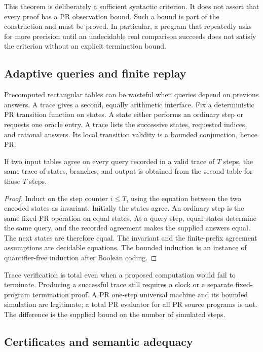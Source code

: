 This theorem is deliberately a sufficient syntactic criterion.  It does
not assert that every proof has a PR observation bound.  Such a bound is
part of the construction and must be proved.  In particular, a program
that repeatedly asks for more precision until an undecidable real
comparison succeeds does not satisfy the criterion without an explicit
termination bound.

\subsection{Adaptive queries and finite replay}

Precomputed rectangular tables can be wasteful when queries depend on
previous answers.  A trace gives a second, equally arithmetic interface.
Fix a deterministic PR transition function on states.  A state either
performs an ordinary step or requests one oracle entry.  A trace lists
the successive states, requested indices, and rational answers.  Its
local transition validity is a bounded conjunction, hence PR.

\begin{lemma}\label{lem:replay}
If two input tables agree on every query recorded in a valid trace of
\(T\) steps, the same trace of states, branches, and output is obtained
from the second table for those \(T\) steps.
\end{lemma}

\begin{proof}
Induct on the step counter \(i\le T\), using the equation between the
two encoded states as invariant.  Initially the states agree.  An ordinary
step is the same fixed PR operation on equal states.  At a query step,
equal states determine the same query, and the recorded agreement makes
the supplied answers equal.  The next states are therefore equal.
The invariant and the finite-prefix agreement assumptions are decidable
equations.  The bounded induction is an instance of quantifier-free
induction after Boolean coding.
\end{proof}

Trace verification is total even when a proposed computation would fail
to terminate.  Producing a successful trace still requires a clock or a
separate fixed-program termination proof.  A PR one-step universal machine
and its bounded simulation are legitimate; a total PR evaluator for all
PR source programs is not.  The difference is the supplied bound on the
number of simulated steps.

\subsection{Certificates and semantic adequacy}

